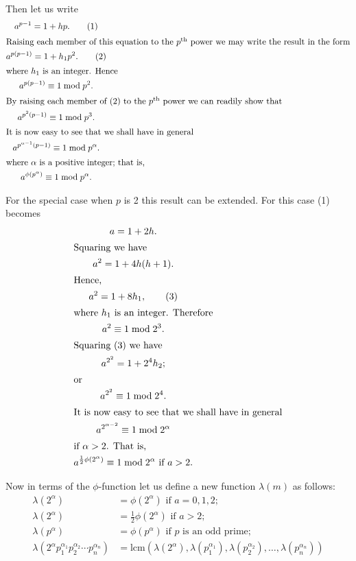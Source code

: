 {Then let us write
\begin{gather}
a^{p-1} = 1 + hp. \tag{1} \\
\intertext{Raising each member of this equation to the
$p^{\text{th}}$ power we may write the result in the form}
a^{p(p-1)} = 1 + h_1p^2. \tag{2} \\
\intertext{where $h_1$ is an integer. Hence}
a^{p(p-1)} \equiv 1 \bmod p^2. \notag \\
\intertext{By raising each member of (2) to the $p^{\text{th}}$
power we can readily show that}
a^{p^2(p-1)} \equiv 1 \bmod p^3. \notag \\
\intertext{It is now easy to see that we shall have in general}
a^{p^{\alpha - 1}(p-1)} \equiv 1 \bmod p^{\alpha}. \notag \\
\intertext{where $\alpha$ is a positive integer; that is,}
a^{\phi(p^{\alpha})} \equiv 1 \bmod p^{\alpha}. \notag
\end{gather}


    
For the special case when $p$ is 2 this result can be extended. For
this case (1) becomes
\begin{gather}
a = 1 + 2h. \notag \\
\intertext{Squaring we have}
a^2 = 1 + 4h(h+1). \notag \\
\intertext{Hence,}
a^2 = 1+8h_1, \tag{3} \\
\intertext{where $h_1$ is an integer. Therefore}
a^2 \equiv 1 \bmod 2^3. \notag \\
\intertext{Squaring (3) we have}
a^{2^2} = 1 + 2^4h_2; \notag \\
\intertext{or}
a^{2^2} \equiv 1 \bmod 2^4. \notag \\
\intertext{It is now easy to see that we shall have in general}
a^{2^{\alpha-2}} \equiv 1 \bmod 2^{\alpha} \notag \\
\intertext{if $\alpha > 2$. That is,}
a^{\frac{1}{2}\phi(2^{\alpha})} \equiv 1 \bmod 2^{\alpha}
  \text{ if } a > 2.
\end{gather}

Now in terms of the $\phi$-function let us define a new function
$\lambda(m)$ as follows:
\begin{align*}
\lambda(2^{\alpha}) &= \phi(2^{\alpha}) \text{ if $a = 0, 1, 2$;} \\
\lambda(2^{\alpha}) &= \frac{1}{2}\phi(2^{\alpha})
                                               \text{ if $a > 2$;} \\
\lambda(p^{\alpha}) &= \phi(p^{\alpha})
                                   \text{ if $p$ is an odd prime;} \\
\lambda(2^{\alpha} p_1^{\alpha_1} p_2^{\alpha_2} \cdots p_n^{\alpha_n}) 
&= \text{lcm}(
    \lambda(2^{\alpha}),
    \lambda(p_1^{\alpha_1}),
    \lambda(p_2^{\alpha_2}), \ldots, \lambda(p_n^{\alpha_n}
    )
)
\end{align*}

}
